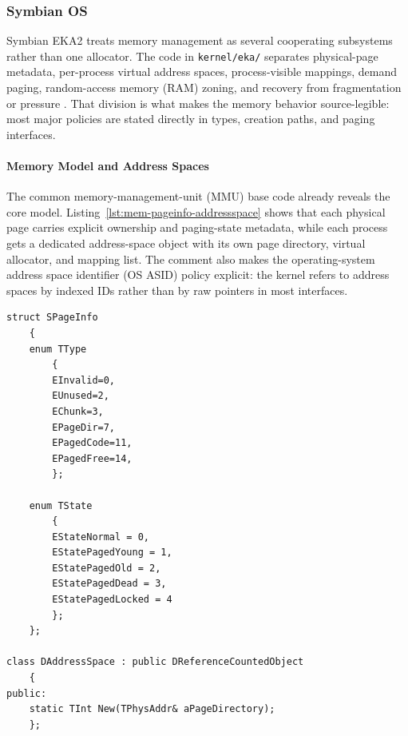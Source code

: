 \subsubsection{Symbian OS}


Symbian EKA2 treats memory management as several cooperating subsystems rather
than one allocator. The code in \texttt{kernel/eka/} separates physical-page
metadata, per-process virtual address spaces, process-visible mappings, demand
paging, random-access memory (RAM) zoning, and recovery from fragmentation or
pressure \citep{sales2005, symbian_eka2_kernel}. That division is what makes
the memory behavior source-legible: most major policies are stated directly in
types, creation paths, and paging interfaces.

\paragraph{Memory Model and Address Spaces}

The common memory-management-unit (MMU) base code already reveals the core
model. Listing~\ref{lst:mem-pageinfo-addressspace} shows that each physical
page carries explicit ownership and paging-state metadata, while each process
gets a dedicated address-space object with its own page directory, virtual
allocator, and mapping list. The comment also makes the operating-system
address space identifier (OS ASID) policy explicit: the kernel refers to
address spaces by indexed IDs rather than by raw pointers in most interfaces.

\begin{listing}[H]
\begin{verbatim}
struct SPageInfo
	{
	enum TType
		{
		EInvalid=0,
		EUnused=2,
		EChunk=3,
		EPageDir=7,
		EPagedCode=11,
		EPagedFree=14,
		};

	enum TState
		{
		EStateNormal = 0,
		EStatePagedYoung = 1,
		EStatePagedOld = 2,
		EStatePagedDead = 3,
		EStatePagedLocked = 4
		};
	};

class DAddressSpace : public DReferenceCountedObject
	{
public:
	static TInt New(TPhysAddr& aPageDirectory);
	};
\end{verbatim}
\caption{Physical-page metadata and per-process address-space objects. Files:
\texttt{mmubase.h} and \texttt{flexible/mmu/maddressspace.h}.}
\label{lst:mem-pageinfo-addressspace}
\end{listing}

